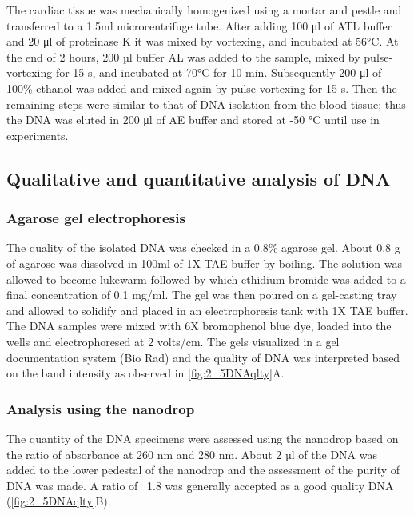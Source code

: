 \begin{refsection}
The cardiac tissue was mechanically homogenized using a mortar and pestle and transferred to a 1.5ml microcentrifuge tube. After adding 100 μl of ATL buffer and 20 μl of proteinase K it was mixed by vortexing, and incubated at 56°C. At the end of 2 hours, 200 µl buffer AL was added to the sample, mixed by pulse-vortexing for 15 s, and incubated at 70°C for 10 min. Subsequently 200 μl of 100\% ethanol was added and mixed again by pulse-vortexing for 15 s. Then the remaining steps were similar to that of DNA isolation from the blood tissue; thus the DNA was eluted in 200 μl of AE buffer and stored at -50 °C until use in experiments. 

\subsection{Qualitative and quantitative analysis of DNA} \label{dnaanalysis}

\subsubsection{Agarose gel electrophoresis}

The quality of the isolated DNA was checked in a 0.8\% agarose gel. About 0.8 g of agarose was dissolved in 100ml of 1X TAE buffer by boiling. The solution was allowed to become lukewarm followed by which ethidium bromide was added to a final concentration of 0.1 mg/ml. The gel was then poured on a gel-casting tray and allowed to solidify and placed in an electrophoresis tank with 1X TAE buffer. The DNA samples were mixed with 6X bromophenol blue dye, loaded into the wells and electrophoresed at 2 volts/cm. The gels visualized in a gel documentation system (Bio Rad) and the quality of DNA was interpreted based on the band intensity as observed in \cref{fig:2_5DNAqlty}A.

\subsubsection{Analysis using the nanodrop} 

The quantity of the DNA specimens were assessed using the nanodrop based on the ratio of absorbance at 260 nm and 280 nm. About 2 µl of the DNA was added to the lower pedestal of the nanodrop and the assessment of the purity of DNA was made. A ratio of ~1.8 was generally accepted as a good quality DNA (\cref{fig:2_5DNAqlty}B).


\end{refsection}
